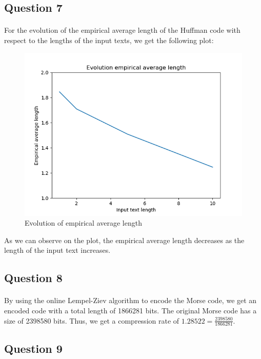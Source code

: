 \documentclass[a4paper, 11pt, oneside]{article}
\begin{document}

\subsection{Question 7}
\paragraph{}For the evolution of the empirical average length of the Huffman code with respect to the lengths of the input texts, we get the following plot:
\begin{figure}[H]
    \centering
    \includegraphics[scale=0.5]{q7.png}
    \caption{Evolution of empirical average length}
\end{figure}
As we can observe on the plot, the empirical average length decreases as the length of the input text increases.


\subsection{Question 8}
\paragraph{}By using the online Lempel-Ziev algorithm to encode the Morse code, we get an encoded code with a total length of 1866281 bits.
The original Morse code has a size of 2398580 bits. Thus, we get a compression rate of $1.28522 = \frac{2398580}{1866281}$.


\subsection{Question 9}
\end{document}
